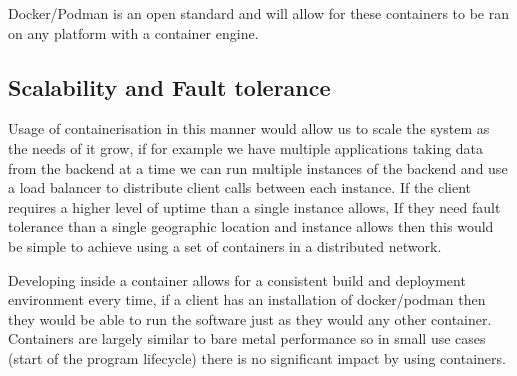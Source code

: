 \documentclass{article}
\begin{document}
Docker/Podman is an open standard and will allow for these containers to be ran 
on any platform with a container engine.

\subsection{Scalability and Fault tolerance}
Usage of containerisation in this manner would allow us to scale the system as the 
needs of it grow, if for example we have multiple applications taking data from the 
backend at a time we can run multiple instances of the backend and use a load balancer 
to distribute client calls between each instance. If the client requires a higher level 
of uptime than a single instance allows, If they need fault tolerance than a single 
geographic location and instance allows then this would be simple to achieve using a 
set of containers in a distributed network.

Developing inside a container allows for a consistent build and deployment environment 
every time, if a client has an installation of docker/podman then they would be able to 
run the software just as they would any other container. Containers are largely similar 
to bare metal performance so in small use cases (start of the program lifecycle) there 
is no significant impact by using containers.
\end{document}
